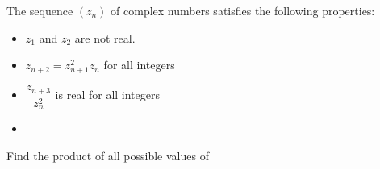 The sequence $(z_n)$ of complex numbers satisfies the following properties:
\begin{itemize}
	\item $z_1$ and $z_2$ are not real.
	\item $z_{n+2}=z_{n+1}^2z_n$ for all integers 
	\item $\dfrac{z_{n+3}}{z_n^2}$ is real for all integers 
	\item 
\end{itemize}
Find the product of all possible values of 